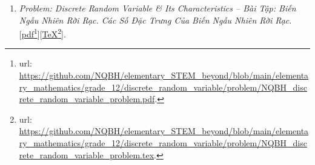 \documentclass[12pt,oneside]{book}
\begin{document}
\begin{enumerate}
	Folder: {\sf Elementary STEM \& Beyond{\tt/}Elementary Mathematics{\tt/}grade 12{\tt/}conditional probability{\tt/}problem}.
	\begin{itemize}
		\item {\it Problem \& Solution: Conditional Probability -- Bài Tập \& Lời Giải: Xác Suất Có Điều Kiện}. [\href{https://github.com/NQBH/elementary_STEM_beyond/blob/main/elementary_mathematics/grade_12/conditional_probability/solution/NQBH_conditional_probability_solution.pdf}{pdf}\footnote{{\sc url}: \url{https://github.com/NQBH/elementary_STEM_beyond/blob/main/elementary_mathematics/grade_12/conditional_probability/solution/NQBH_conditional_probability_solution.pdf}.}][\href{https://github.com/NQBH/elementary_STEM_beyond/blob/main/elementary_mathematics/grade_12/conditional_probability/solution/NQBH_conditional_probability_solution.tex}{\TeX}\footnote{{\sc url}: \url{https://github.com/NQBH/elementary_STEM_beyond/blob/main/elementary_mathematics/grade_12/conditional_probability/solution/NQBH_conditional_probability_solution.tex}.}].
		
		Folder: {\sf Elementary STEM \& Beyond{\tt/}Elementary Mathematics{\tt/}grade 12{\tt/}conditional probability{\tt/}solution}.
	\end{itemize}
	\item {\it Problem: Discrete Random Variable \& Its Characteristics -- Bài Tập: Biến Ngẫu Nhiên Rời Rạc. Các Số Đặc Trưng Của Biến Ngẫu Nhiên Rời Rạc}. [\href{https://github.com/NQBH/elementary_STEM_beyond/blob/main/elementary_mathematics/grade_12/discrete_random_variable/problem/NQBH_discrete_random_variable_problem.pdf}{pdf}\footnote{{\sc url}: \url{https://github.com/NQBH/elementary_STEM_beyond/blob/main/elementary_mathematics/grade_12/discrete_random_variable/problem/NQBH_discrete_random_variable_problem.pdf}.}][\href{https://github.com/NQBH/elementary_STEM_beyond/blob/main/elementary_mathematics/grade_12/discrete_random_variable/problem/NQBH_discrete_random_variable_problem.tex}{\TeX}\footnote{{\sc url}: \url{https://github.com/NQBH/elementary_STEM_beyond/blob/main/elementary_mathematics/grade_12/discrete_random_variable/problem/NQBH_discrete_random_variable_problem.tex}.}].
	

\end{enumerate}
\end{document}
